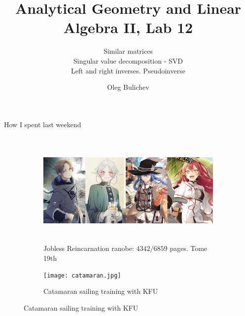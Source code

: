 \documentclass[aspectratio=169]{beamer}
\title[AGLA2]{Analytical Geometry and Linear Algebra II, Lab 12} %
\subtitle{Similar matrices \\ Singular value decomposition - SVD \\ Left and right inverses. Pseudoinverse
         } %
\author{Oleg Bulichev}
\newcommand{\fbckg}[1]{\usebackgroundtemplate{\texttt{[image: \#1]}}}%
\begin{document}
\setlength{\abovedisplayskip}{0pt}
\setlength{\belowdisplayskip}{0pt}
\setlength{\abovedisplayshortskip}{0pt}
\setlength{\belowdisplayshortskip}{0pt}

\fbckg{fibeamer/figs/title_page.png}

\fbckg{fibeamer/figs/common.png}

\begin{frame}[c]{How I spent last weekend}
    \framesubtitle{}
    \begin{figure}[H]
        \begin{subfigure}[b]{0.64\textwidth}
            \centering\includegraphics[height=5.5cm,width=1\textwidth,keepaspectratio]{jobless_reincarnation.jpg}
            \caption*{Jobless Reincarnation ranobe: $4342/6859$ pages. Tome 19th}
        \end{subfigure}     
        \hfill
        \begin{subfigure}[b]{0.34\textwidth}
            \centering\texttt{[image: catamaran.jpg]}
            \caption*{Catamaran sailing training with KFU}
        \end{subfigure}
    \end{figure}
\end{frame}
\end{document}
